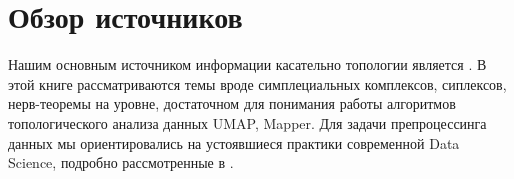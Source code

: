 \section{Обзор источников}

Нашим основным источником информации касательно топологии является \cite{temp}.
В этой книге рассматриваются темы вроде симплециальных комплексов, сиплексов, нерв-теоремы на уровне, достаточном для понимания работы алгоритмов топологического анализа данных UMAP, Mapper.
Для задачи препроцессинга данных мы ориентировались на устоявшиеся практики современной Data Science, подробно рассмотренные в \cite{feature-eng, feature-eng-sel}.